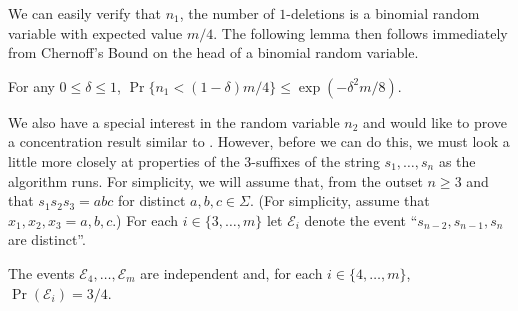 \documentclass{patmorin}
\begin{document}
We can easily verify that $n_1$, the number of $1$-deletions is a binomial random variable with expected value $m/4$.  The following lemma then follows immediately from Chernoff's Bound on the head of a binomial random variable.

\begin{lem}
  For any $0\le\delta\le 1$, $\Pr\{n_1 < (1-\delta)m/4\} \le \exp(-\delta^2 m/8)$.
\end{lem}

We also have a special interest in the random variable $n_2$ and would like to prove a concentration result similar to .  However, before we can do this, we must look a little more closely at properties of the 3-suffixes of the string $s_1,\ldots,s_n$ as the algorithm runs.  For simplicity, we will assume that, from the outset $n\ge 3$ and that $s_1s_2s_3=abc$ for distinct $a,b,c\in\Sigma$.  (For simplicity, assume that $x_1,x_2,x_3=a,b,c$.)  For each $i\in\{3,\ldots,m\}$ let $\mathcal{E}_i$ denote the event ``$s_{n-2},s_{n-1},s_n$ are distinct''.

\begin{lem}
  The events $\mathcal{E}_4,\ldots,\mathcal{E}_m$ are independent and, for each $i\in\{4,\ldots,m\}$, $\Pr(\mathcal{E}_i)=3/4$.
\end{lem} 
\end{document}
